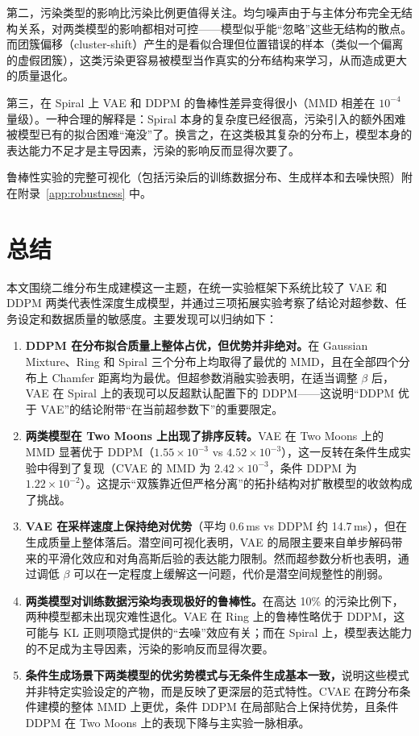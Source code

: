 \documentclass[UTF8,a4paper,12pt]{ctexart}
\begin{document}
第二，污染类型的影响比污染比例更值得关注。均匀噪声由于与主体分布完全无结构关系，对两类模型的影响都相对可控——模型似乎能“忽略”这些无结构的散点。而团簇偏移（cluster-shift）产生的是看似合理但位置错误的样本（类似一个偏离的虚假团簇），这类污染更容易被模型当作真实的分布结构来学习，从而造成更大的质量退化。

第三，在 Spiral 上 VAE 和 DDPM 的鲁棒性差异变得很小（MMD 相差在 $10^{-4}$ 量级）。一种合理的解释是：Spiral 本身的复杂度已经很高，污染引入的额外困难被模型已有的拟合困难“淹没”了。换言之，在这类极其复杂的分布上，模型本身的表达能力不足才是主导因素，污染的影响反而显得次要了。

鲁棒性实验的完整可视化（包括污染后的训练数据分布、生成样本和去噪快照）附在附录~\ref{app:robustness} 中。

\section{总结}

本文围绕二维分布生成建模这一主题，在统一实验框架下系统比较了 VAE 和 DDPM 两类代表性深度生成模型，并通过三项拓展实验考察了结论对超参数、任务设定和数据质量的敏感度。主要发现可以归纳如下：

\begin{enumerate}
    \item \textbf{DDPM 在分布拟合质量上整体占优，但优势并非绝对。}在 Gaussian Mixture、Ring 和 Spiral 三个分布上均取得了最优的 MMD，且在全部四个分布上 Chamfer 距离均为最优。但超参数消融实验表明，在适当调整 $\beta$ 后，VAE 在 Spiral 上的表现可以反超默认配置下的 DDPM——这说明“DDPM 优于 VAE”的结论附带“在当前超参数下”的重要限定。

    \item \textbf{两类模型在 Two Moons 上出现了排序反转。}VAE 在 Two Moons 上的 MMD 显著优于 DDPM（$1.55\times 10^{-3}$ vs $4.52\times 10^{-3}$），这一反转在条件生成实验中得到了复现（CVAE 的 MMD 为 $2.42\times 10^{-3}$，条件 DDPM 为 $1.22\times 10^{-2}$）。这提示“双簇靠近但严格分离”的拓扑结构对扩散模型的收敛构成了挑战。

    \item \textbf{VAE 在采样速度上保持绝对优势}（平均 0.6\,ms vs DDPM 约 14.7\,ms），但在生成质量上整体落后。潜空间可视化表明，VAE 的局限主要来自单步解码带来的平滑化效应和对角高斯后验的表达能力限制。然而超参数分析也表明，通过调低 $\beta$ 可以在一定程度上缓解这一问题，代价是潜空间规整性的削弱。

    \item \textbf{两类模型对训练数据污染均表现极好的鲁棒性。}在高达 10\% 的污染比例下，两种模型都未出现灾难性退化。VAE 在 Ring 上的鲁棒性略优于 DDPM，这可能与 KL 正则项隐式提供的“去噪”效应有关；而在 Spiral 上，模型表达能力的不足成为主导因素，污染的影响反而显得次要。

    \item \textbf{条件生成场景下两类模型的优劣势模式与无条件生成基本一致，}说明这些模式并非特定实验设定的产物，而是反映了更深层的范式特性。CVAE 在跨分布条件建模的整体 MMD 上更优，条件 DDPM 在局部贴合上保持优势，且条件 DDPM 在 Two Moons 上的表现下降与主实验一脉相承。
\end{enumerate}
\end{document}
